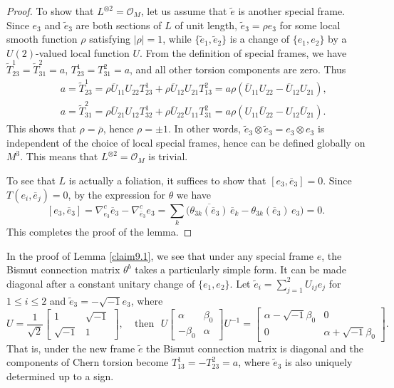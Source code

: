 \documentclass{amsart}
\numberwithin{equation}{section}
\theoremstyle{definition}
\renewcommand{\1}{\mathds{1}}
\renewcommand{\>}{\rightarrow}
\begin{document}
\begin{proof}
To show that $L^{\otimes 2}={\mathcal O}_{\!M}$, let us assume that $\tilde{e}$ is another special frame. Since $e_3$ and $\tilde{e}_3$ are both sections of $L$ of unit length, $\tilde{e}_3=\rho e_3$ for some local smooth function $\rho$ satisfying $|\rho |=1$, while $\{ \tilde{e}_1, \tilde{e}_2\}$ is a change of $\{ e_1, e_2\}$ by a $U(2)$-valued local function $U$. From the definition of special frames, we have $\tilde{T}^1_{23}=\tilde{T}^2_{31}=a$, $T^1_{23}=T^2_{31}=a$, and all other torsion components are zero. Thus
\begin{eqnarray*}
&&  a=\tilde{T}^1_{23} = \rho \overline{U}_{11} U_{22} T^1_{23}+ \rho \overline{U}_{12} U_{21}T^2_{13} =a \rho (\overline{U}_{11}U_{22}-\overline{U}_{12}U_{21}), \\
&& a=\tilde{T}^2_{31} = \rho \overline{U}_{21}U_{12}T^1_{32}+ \rho \overline{U}_{22}U_{11}T^2_{31} =a \rho (U_{11} \overline{U}_{22}-U_{12}\overline{U}_{21}).
\end{eqnarray*}
This shows that $\rho =\overline{\rho}$, hence $\rho =\pm 1$. In other words, $\tilde{e}_3\otimes \tilde{e}_3 = e_3\otimes e_3 $ is independent of the choice of local special frames, hence can be defined  globally on $M^3$. This means that $L^{\otimes 2}={\mathcal O}_{\!M}$ is trivial.

To see that $L$ is actually a foliation, it suffices to show that $[e_3,\overline{e}_3]=0$. Since $T(e_i, \overline{e}_j)=0$, by the expression for $\theta$ we have
$$ [e_3,\overline{e}_3]=\nabla^c_{e_3}\overline{e}_3 - \nabla^c_{\overline{e}_3}e_3= \sum_k \big( \overline{\theta_{3k}(\overline{e}_3)} \,\overline{e}_k - \theta_{3k}(\overline{e}_3) \, e_3 \big) = 0.$$
This completes the proof of the lemma.
\end{proof}


In the proof of Lemma \ref{claim9.1}, we see that under any special frame $e$, the Bismut connection matrix $\theta^b$ takes a particularly simple form. It can be made diagonal after a constant unitary change of $\{ e_1, e_2\}$. Let
$ \tilde{e}_i=\sum_{j=1}^2 U_{ij}e_j$ for $ 1\leq i\leq 2$ and $\tilde{e}_3=-\sqrt{-1}e_3$, where
$$ U= \frac{1}{\sqrt{2}} \left[ \begin{array}{cc} 1 & \sqrt{-1}\\ \sqrt{-1} & 1 \end{array} \right], \ \ \  \ \ \mbox{then} \ \ \
U \left[ \begin{array}{cc} \alpha & \beta_0 \\ -\beta_0 & \alpha  \end{array} \right] U^{-1}
= \left[ \begin{array}{cc} \alpha -\sqrt{-1}\beta_0 & 0 \\ 0 & \alpha +\sqrt{-1}\beta_0   \end{array} \right]  .$$
That is, under the new frame $\tilde{e}$ the Bismut connection matrix is diagonal and the components of Chern torsion
become $T^1_{13}=-T^2_{23}=a$, where $\tilde{e}_3$ is also uniquely determined up to a sign.
\end{document}
